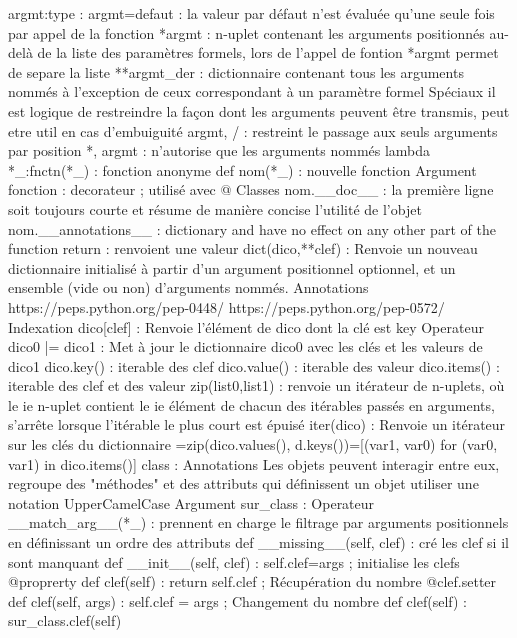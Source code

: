\documentclass[a4paper,12pt]{report}
\begin{document}
		argmt:type : 
		argmt=defaut : la valeur par défaut n'est évaluée qu'une seule fois par appel de la fonction
		*argmt : n-uplet contenant les arguments positionnés au-delà de la liste des paramètres formels, lors de l'appel de fontion *argmt permet de separe la liste
		**argmt\_der : dictionnaire contenant tous les arguments nommés à l'exception de ceux correspondant à un paramètre formel
		Spéciaux  il est logique de restreindre la façon dont les arguments peuvent être transmis, peut etre util en cas d'embuiguité
			argmt, / : restreint le passage aux seuls arguments par position
			*, argmt : n'autorise que les arguments nommés
	lambda *\_:fnctn(*\_) : fonction anonyme
	def nom(*\_) : nouvelle fonction
		Argument
			fonction : decorateur ; utilisé avec @
		Classes
			nom.\_\_doc\_\_ : la première ligne soit toujours courte et résume de manière concise l'utilité de l'objet
			nom.\_\_annotations\_\_ : dictionary and have no effect on any other part of the function
			return : renvoient une valeur
	dict(dico,**clef) : Renvoie un nouveau dictionnaire initialisé à partir d'un argument positionnel optionnel, et un ensemble (vide ou non) d'arguments nommés.
		Annotations
			https://peps.python.org/pep-0448/
			https://peps.python.org/pep-0572/
		Indexation
			dico[clef] : Renvoie l'élément de dico dont la clé est key
		Operateur
			dico0 |= dico1 : Met à jour le dictionnaire dico0 avec les clés et les valeurs de dico1
			dico.key() : iterable des clef
			dico.value() : iterable des valeur
			dico.items() : iterable des clef et des valeur
			zip(list0,list1) : renvoie un itérateur de n-uplets, où le ie n-uplet contient le ie élément de chacun des itérables passés en arguments, s'arrête lorsque l'itérable le plus court est épuisé
			iter(dico) : Renvoie un itérateur sur les clés du dictionnaire =zip(dico.values(), d.keys())=[(var1, var0) for (var0, var1) in dico.items()]
	class :
		Annotations
			Les objets peuvent interagir entre eux, regroupe des "méthodes" et des attributs qui définissent un objet
			utiliser une notation UpperCamelCase
		Argument
			sur\_class : 
		Operateur
			\_\_match\_arg\_\_(*\_) : prennent en charge le filtrage par arguments positionnels en définissant un ordre des attributs
			def \_\_missing\_\_(self, clef) : cré les clef si il sont manquant
			def \_\_init\_\_(self, clef) : self.clef=args ; initialise les clefs
			@proprerty def clef(self) : return self.clef ; Récupération du nombre
			@clef.setter def clef(self, args) : self.clef = args ; Changement du nombre
			def clef(self) : sur\_class.clef(self)
\end{document}
